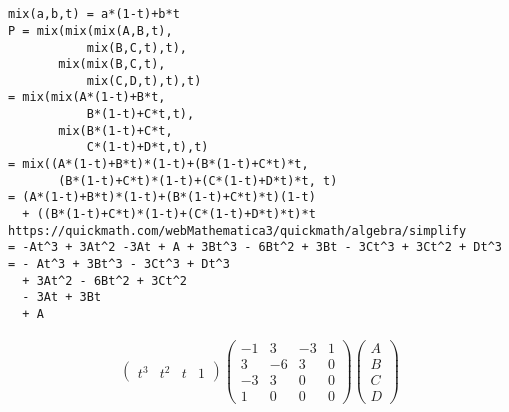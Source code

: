 \documentclass[12pt, border = 4pt, multi]{article} %
\begin{document}
\section*{}
\begin{verbatim}
mix(a,b,t) = a*(1-t)+b*t
P = mix(mix(mix(A,B,t),
           mix(B,C,t),t),
       mix(mix(B,C,t),
           mix(C,D,t),t),t)
= mix(mix(A*(1-t)+B*t,
           B*(1-t)+C*t,t),
       mix(B*(1-t)+C*t,
           C*(1-t)+D*t,t),t)
= mix((A*(1-t)+B*t)*(1-t)+(B*(1-t)+C*t)*t,
       (B*(1-t)+C*t)*(1-t)+(C*(1-t)+D*t)*t, t)
= (A*(1-t)+B*t)*(1-t)+(B*(1-t)+C*t)*t)(1-t)
  + ((B*(1-t)+C*t)*(1-t)+(C*(1-t)+D*t)*t)*t
https://quickmath.com/webMathematica3/quickmath/algebra/simplify
= -At^3 + 3At^2 -3At + A + 3Bt^3 - 6Bt^2 + 3Bt - 3Ct^3 + 3Ct^2 + Dt^3
= - At^3 + 3Bt^3 - 3Ct^3 + Dt^3
  + 3At^2 - 6Bt^2 + 3Ct^2
  - 3At + 3Bt 
  + A
\end{verbatim}
\begin{align*}
\begin{pmatrix}
t ^ 3 & t ^ 2 & t & 1
\end{pmatrix}
\begin{pmatrix}
-1 & 3 & -3 & 1\\
3 & -6 & 3 & 0\\
-3 & 3 & 0 & 0\\ 
1 & 0 & 0 & 0
\end{pmatrix}
\begin{pmatrix}
A\\
B\\
C\\
D
\end{pmatrix}
\end{align*}
\end{document}
